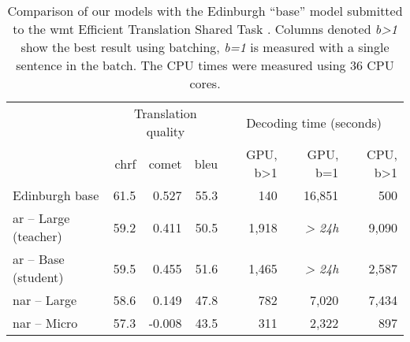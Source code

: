 \begin{table}
  \centering

  \begin{tabular}{lrrrrrr}
    \toprule
    & \multicolumn{3}{c}{Translation quality} & \multicolumn{3}{c}{Decoding time (seconds)} \\
    & {\small \acs{chrf}} & {\small \acs{comet}} & {\small \acs{bleu}} & {\small GPU, b>1} & {\small GPU, b=1} & {\small CPU, b>1} \\
    \midrule
    Edinburgh base & 61.5 & 0.527 & 55.3 & 140 & 16,851 & 500 \\
    \midrule
    \acs{ar} -- Large (teacher) & 59.2 & 0.411 & 50.5 & 1,918 & {\it > 24h} & 9,090 \\
    \acs{ar} -- Base (student) & 59.5 & 0.455 & 51.6 & 1,465 & {\it > 24h} & 2,587 \\
    \addlinespace
    \acs{nar} -- Large & 58.6 & 0.149 & 47.8 & 782 & 7,020 & 7,434 \\
    \acs{nar} -- Micro & 57.3 & -0.008 & 43.5 & 311 & 2,322 & 897 \\
    \bottomrule
  \end{tabular}

  \caption{Comparison of our models with the Edinburgh ``base'' model submitted
    to the \acs{wmt} Efficient Translation Shared Task
    \citep{Behnke-wmt21-speed}. Columns denoted \emph{b>1} show the best result
    using batching, \emph{b=1} is measured with a single sentence in the
    batch. The CPU times were measured using 36 CPU cores.} %
  \label{tab:efficiency:comparison}
\end{table}

